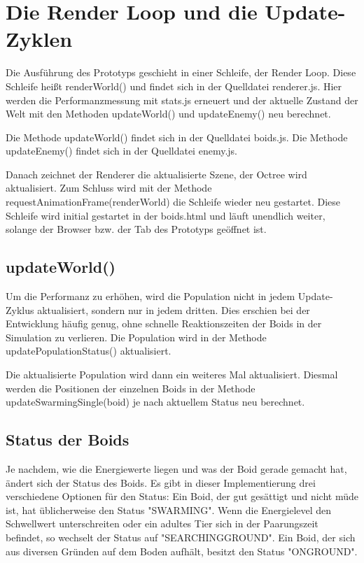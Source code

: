 \documentclass[draft=false
              ,paper=a4
              ,twoside=false
              ,fontsize=11pt
              ,headsepline
              ,BCOR10mm
              ,DIV11
              ,bibtotoc
              ,liststotoc
              ]{scrbook}
\begin{document}
\section{Die Render Loop und die Update-Zyklen}
Die Ausführung des Prototyps geschieht in einer Schleife, der Render Loop. Diese Schleife heißt renderWorld() und findet sich in der Quelldatei renderer.js. Hier werden die Performanzmessung mit stats.js erneuert und der aktuelle Zustand der Welt mit den Methoden updateWorld() und updateEnemy() neu berechnet.

Die Methode updateWorld() findet sich in der Quelldatei boids.js. Die Methode updateEnemy() findet sich in der Quelldatei enemy.js.

Danach zeichnet der Renderer die aktualisierte Szene, der Octree wird aktualisiert. Zum Schluss wird mit der Methode requestAnimationFrame(renderWorld) die Schleife wieder neu gestartet. Diese Schleife wird initial gestartet in der boids.html und läuft unendlich weiter, solange der Browser bzw. der Tab des Prototyps geöffnet ist.

\subsection{updateWorld()}
Um die Performanz zu erhöhen, wird die Population nicht in jedem Update-Zyklus aktualisiert, sondern nur in jedem dritten. Dies erschien bei der Entwicklung häufig genug, ohne schnelle Reaktionszeiten der Boids in der Simulation zu verlieren. Die Population wird in der Methode updatePopulationStatus() aktualisiert.

Die aktualisierte Population wird dann ein weiteres Mal aktualisiert. Diesmal werden die Positionen der einzelnen Boids in der Methode updateSwarmingSingle(boid) je nach aktuellem Status neu berechnet.

\subsection{Status der Boids}
Je nachdem, wie die Energiewerte liegen und was der Boid gerade gemacht hat, ändert sich der Status des Boids. Es gibt in dieser Implementierung drei verschiedene Optionen für den Status:
Ein Boid, der gut gesättigt und nicht müde ist, hat üblicherweise den Status "{}SWARMING"{}. Wenn die Energielevel den Schwellwert unterschreiten oder ein adultes Tier sich in der Paarungszeit befindet, so wechselt der Status auf "{}SEARCHINGGROUND"{}. Ein Boid, der sich aus diversen Gründen auf dem Boden aufhält, besitzt den Status "{}ONGROUND"{}.
\end{document}
